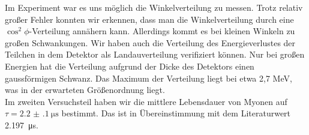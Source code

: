 Im Experiment war es uns möglich die Winkelverteilung zu messen. Trotz relativ großer Fehler konnten wir erkennen, dass man die Winkelverteilung durch eine $\cos^2{\phi}$-Verteilung annähern kann. Allerdings kommt es bei kleinen Winkeln zu großen Schwankungen. Wir haben auch die Verteilung des Energieverlustes der Teilchen in dem Detektor als Landauverteilung verifiziert können. Nur bei großen Energien hat die Verteilung aufgrund der Dicke des Detektors einen gaussförmigen Schwanz. Das Maximum der Verteilung liegt bei etwa 2,7 \si{\mega\eV}, was in der erwarteten Größenordnung liegt.\\
Im zweiten Versuchsteil haben wir die mittlere Lebensdauer von Myonen auf $\tau = \SI[separate-uncertainty = true]{2.2(1)}{\micro\second}$ bestimmt. Das ist in Übereinstimmung mit dem Literaturwert \SI{2.197}{\micro\second}\cite{pdg}.